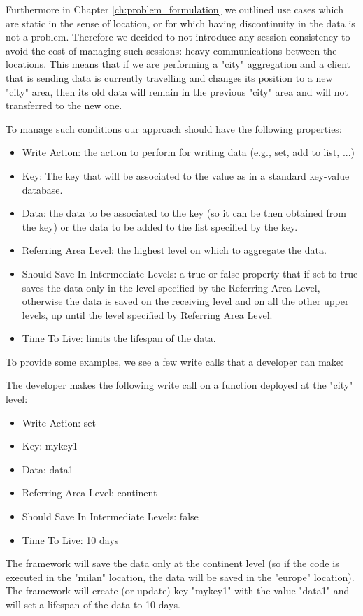 Furthermore in Chapter \ref{ch:problem_formulation} we outlined use cases which are static in the sense of location, or for which having discontinuity in the data is not a problem. Therefore we decided to not introduce any session consistency to avoid the cost of managing such sessions: heavy communications between the locations. This means that if we are performing a "city" aggregation and a client that is sending data is currently travelling and changes its position to a new "city" area, then its old data will remain in the previous "city" area and will not transferred to the new one.

To manage such conditions our approach should have the following properties:
\begin{itemize}
    \item Write Action: the action to perform for writing data (e.g., set, add to list, ...)
    \item Key: The key that will be associated to the value as in a standard key-value database.
     \item Data: the data to be associated to the key (so it can be then obtained from the key) or the data to be added to the list specified by the key.
     \item Referring Area Level: the highest level on which to aggregate the data.
     \item Should Save In Intermediate Levels: a true or false property that if set to true saves the data only in the level specified by the Referring Area Level, otherwise the data is saved on the receiving level and on all the other upper levels, up until the level specified by Referring Area Level.
     \item Time To Live: limits the lifespan of the data.
\end{itemize}

To provide some examples, we see a few write calls that a developer can make:

\begin{example}
The developer makes the following write call on a function deployed at the "city" level:
\begin{itemize}
    \item Write Action: set
    \item Key: mykey1
    \item Data: data1
    \item Referring Area Level: continent
    \item Should Save In Intermediate Levels: false
    \item Time To Live: 10 days
\end{itemize}
The framework will save the data only at the continent level (so if the code is executed in the "milan" location, the data will be saved in the "europe" location). The framework will create (or update) key "mykey1" with the value "data1" and will set a lifespan of the data to 10 days.
\end{example}

